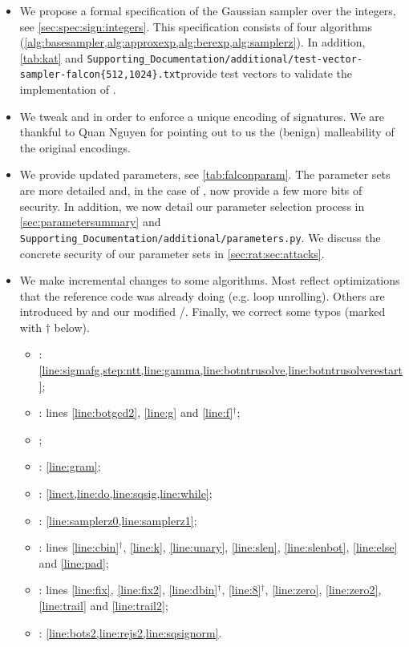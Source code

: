 \begin{itemize}
	\item We propose a formal specification of the Gaussian sampler over the integers, see \cref{sec:spec:sign:integers}. This specification consists of four algorithms (\cref{alg:basesampler,alg:approxexp,alg:berexp,alg:samplerz}). In addition, \cref{tab:kat} and {\small\tt Supporting\_Documentation/additional/test-vector-sampler-falcon\{512,1024\}.txt}\newline provide test vectors to validate the implementation of \samplerz.
	\item We tweak \longcompress and \longdecompress in order to enforce a unique encoding of signatures. We are thankful to Quan Nguyen for pointing out to us the (benign) malleability of the original encodings.
	\item We provide updated parameters, see \cref{tab:falconparam}. The parameter sets are more detailed and, in the case of , now provide a few more bits of security. In addition, we now detail our parameter selection process in \cref{sec:parametersummary} and {\small\tt Supporting\_Documentation/additional/parameters.py}. We discuss the concrete security of our parameter sets in \cref{sec:rat:sec:attacks}.
	
	\item We make incremental changes to some algorithms. Most reflect optimizations that the reference code was already doing (e.g. loop unrolling). Others are introduced by \samplerz and our modified \compress/\decompress.
	Finally, we correct some typos (marked with $\dagger$ below).
	
	\begin{multicols*}{2}
	\begin{itemize}
	\setlength\itemsep{.4em}
	\item 
	\ntrugen:	\cref{line:sigmafg,step:ntt,line:gamma,line:botntrusolve,line:botntrusolverestart};
	\item
	\ntrusolve:	lines \ref{line:botgcd2}, \ref{line:g} and \ref{line:f}${}^\dagger$;
	\item
	\ldlalgo;
	\item
	\ffldl:	\cref{line:gram};
	\item
	\sign: \cref{line:t,line:do,line:sqsig,line:while};
	\item
	\ffsampling:
	\cref{line:samplerz0,line:samplerz1};
	\item
	\compress: lines \ref{line:cbin}${}^\dagger$, \ref{line:k}, \ref{line:unary}, \ref{line:slen}, \ref{line:slenbot}, \ref{line:else} and \ref{line:pad};
	\item
	\decompress:
	lines \ref{line:fix}, \ref{line:fix2}, \ref{line:dbin}${}^\dagger$, \ref{line:8}${}^\dagger$, \ref{line:zero}, \ref{line:zero2}, \ref{line:trail} and \ref{line:trail2};
	\item
	\verify:
	\cref{line:bots2,line:rejs2,line:sqsignorm}.
	\end{itemize}
	\end{multicols*}
\end{itemize}
